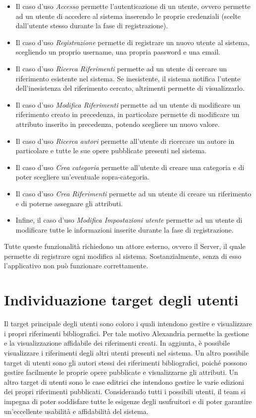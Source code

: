\begin{itemize}
    \item Il caso d'uso \textit{Accesso} permette l'autenticazione di un utente, ovvero permette ad un utente di accedere al sistema inserendo le proprie credenziali (scelte dall'utente stesso durante la fase di registrazione).
    \item  Il caso d'uso \textit{Registrazione} permette di registrare un nuovo utente al sistema, scegliendo un proprio username, una propria password e una email.
    \item Il caso d'uso \textit{Ricerca Riferimenti} permette ad un utente di cercare un riferimento esistente nel sistema. Se inesistente, il sistema notifica l'utente dell'inesistenza del riferimento cercato, altrimenti permette di visualizzarlo. 
    \item Il caso d'uso \textit{Modifica Riferimenti} permette ad un utente di modificare un riferimento creato in precedenza, in particolare permette di modificare un \gls{attributo} inserito in precedenza,  potendo scegliere un nuovo valore. 
    \item  Il caso d'uso \textit{Ricerca autori} permette all'utente di ricercare un autore in particolare e tutte le sue opere pubblicate presenti nel sistema.
    \item Il caso d'uso \textit{Crea categoria} permette all'utente di creare una categoria e di poter scegliere un'eventuale \gls{sopra-categoria}.
    \item  Il caso d'uso \textit{Crea Riferimenti} permette ad un utente di creare un riferimento e di poterne assegnare gli attributi. 
    \item Infine, il caso d'uso \textit{Modifica Impostazioni utente} permette ad un utente di modificare tutte le informazioni inserite durante la fase di registrazione.
\end{itemize}
Tutte queste funzionalità richiedono un attore esterno, ovvero il Server, il quale permette di registrare ogni modifica al sistema. Sostanzialmente, senza di esso l'applicativo non può funzionare correttamente.


\raggedright{\section{Individuazione target degli utenti}}
Il target principale degli utenti sono coloro i quali intendono gestire e visualizzare i propri riferimenti bibliografici. Per tale motivo Alexandria permette la gestione e la visualizzazione affidabile dei riferimenti creati. In aggiunta, è possibile visualizzare i riferimenti degli altri utenti presenti nel sistema.
Un altro possibile target di utenti sono gli autori stessi dei riferimenti bibliografici, poiché possono gestire facilmente le proprie opere pubblicate e visualizzarne gli attributi.
Un altro target di utenti sono le case editrici che intendono gestire le varie edizioni dei propri riferimenti pubblicati. 
Considerando tutti i possibili utenti, il team si impegna di poter soddisfare tutte le esigenze degli usufruitori e di poter garantire un'eccellente usabilità e affidabilità del sistema.

